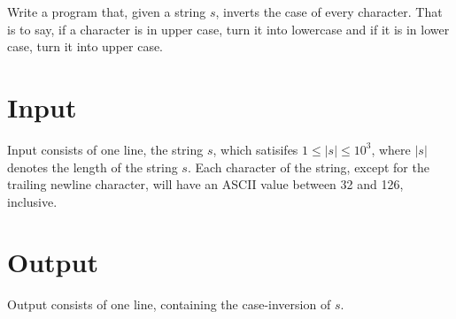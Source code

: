 
Write a program that, given a string $s$, inverts the case of every character.
That is to say, if a character is in upper case, turn it into lowercase and if it is in lower case, turn it into upper case.

\section*{Input}
Input consists of one line, the string $s$, which satisifes $1 \leq |s| \leq 10^3$,
where $|s|$ denotes the length of the string $s$.
Each character of the string, except for the trailing newline character, will have an ASCII value between 32 and 126, inclusive.

\section*{Output}
Output consists of one line, containing the case-inversion of $s$.
